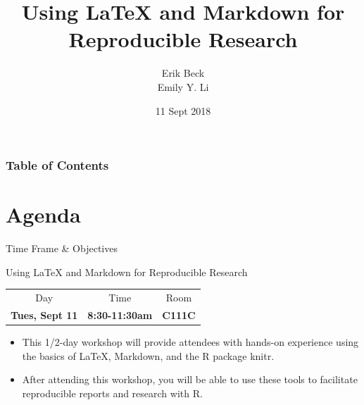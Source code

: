 \documentclass{beamer}
\title{Using LaTeX and Markdown for Reproducible Research}
\subtitle{}
\author{Erik Beck \\ Emily Y. Li}
\institute{2018 US EPA \\ R User Group Workshop}
\date{11 Sept 2018}
\begin{document}
    \begin{frame}
        \maketitle
    \end{frame}
    
    \begin{frame}
        \frametitle{Table of Contents}
        \tableofcontents
    \end{frame}

\section{Agenda}

\begin{frame}{Time Frame \& Objectives}
\begin{exampleblock}{Using LaTeX and Markdown for Reproducible Research}
\begin{center}
    \begin{tabular}{c c c}
    Day & Time & Room \\
    \textbf{Tues, Sept 11} & \textbf{8:30-11:30am} & \textbf{C111C}
\end{tabular}
\end{center}
\end{exampleblock}

\begin{itemize}
    \item This 1/2-day workshop will provide attendees with hands-on experience
using the basics of LaTeX, Markdown, and the R package knitr.
    \item After attending this workshop, you will be able to use these tools to
facilitate reproducible reports and research with R.
\end{itemize}
\end{frame}
\end{document}
